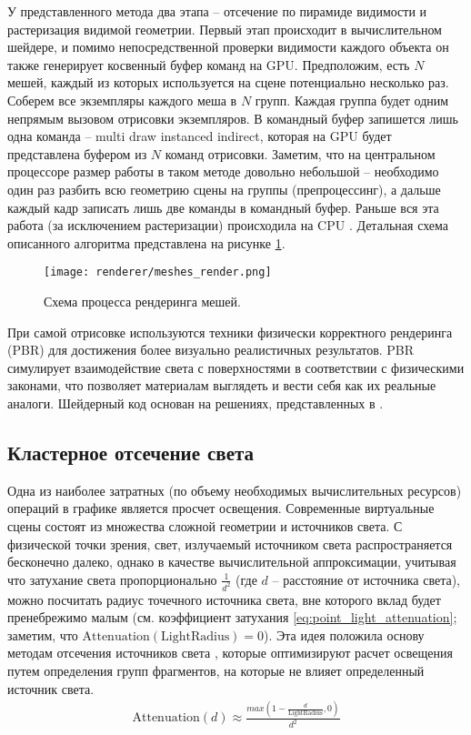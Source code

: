 У представленного метода два этапа -- отсечение по пирамиде видимости и растеризация видимой геометрии. Первый этап происходит в вычислительном шейдере, и помимо непосредственной проверки видимости каждого объекта он также генерирует косвенный буфер команд на GPU. Предположим, есть $N$ мешей, каждый из которых используется на сцене потенциально несколько раз. Соберем все экземпляры каждого меша в $N$ групп. Каждая группа будет одним непрямым вызовом отрисовки экземпляров. В командный буфер запишется лишь одна команда -- multi draw instanced indirect, которая на GPU будет представлена буфером из $N$ команд отрисовки. Заметим, что на центральном процессоре размер работы в таком методе довольно небольшой -- необходимо один раз разбить всю геометрию сцены на группы (препроцессинг), а дальше каждый кадр записать лишь две команды в командный буфер. Раньше вся эта работа (за исключением растеризации) происходила на CPU \cite{frustum_culling_2000}. Детальная схема описанного алгоритма представлена на рисунке \ref{fig:meshes_render}.

\begin{figure}[h]
    \centering
    \texttt{[image: renderer/meshes\_render.png]}
    \caption{Схема процесса рендеринга мешей.}
    \label{fig:meshes_render}
\end{figure}

При самой отрисовке используются техники физически корректного рендеринга (PBR) для достижения более визуально реалистичных результатов. PBR симулирует взаимодействие света с поверхностями в соответствии с физическими законами, что позволяет материалам выглядеть и вести себя как их реальные аналоги. Шейдерный код основан на решениях, представленных в \cite{pbr_book2016}.

\subsection{Кластерное отсечение света}
Одна из наиболее затратных (по объему необходимых вычислительных ресурсов) операций в графике является просчет освещения. Современные виртуальные сцены состоят из множества сложной геометрии и источников света. С физической точки зрения, свет, излучаемый источником света распространяется бесконечно далеко, однако в качестве вычислительной аппроксимации, учитывая что затухание света пропорционально $\frac{1}{d^2}$ (где $d$ -- расстояние от источника света), можно посчитать радиус точечного источника света, вне которого вклад будет пренебрежимо малым (см. коэффициент затухания \ref{eq:point_light_attenuation}; заметим, что $\text{Attenuation}(\text{LightRadius}) = 0$). Эта идея положила основу методам отсечения источников света \cite{Harada2012ForwardBD}, которые оптимизируют расчет освещения путем определения групп фрагментов, на которые не влияет определенный источник света.
\begin{align}
    \text{Attenuation}(d) \approx \frac{max \left(1 - \frac{d}{\text{LightRadius}}, 0\right) }{d^2}
    \label{eq:point_light_attenuation}
\end{align}


